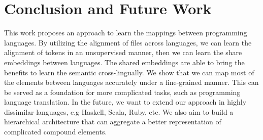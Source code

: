 \section{Conclusion and Future Work}
This work proposes an approach to learn the mappings between programming languages. By utilizing the alignment of files across languages, we can learn the alignment of tokens in an unsupervised manner, then we can learn the share embeddings between languages. The shared embeddings are able to bring the benefits to learn the semantic cross-lingually. We show that we can map most of the elements between languages accurately under a fine-grained manner. This can be served as a foundation for more complicated tasks, such as programming language translation. In the future, we want to extend our approach in highly dissimilar languages, e.g Haskell, Scala, Ruby, etc. We also aim to build a hierarchical architecture that can aggregate a better representation of complicated compound elements.



\begin{acks}
	
\end{acks}
